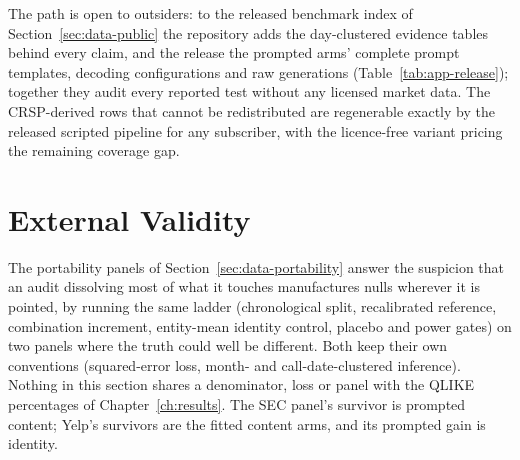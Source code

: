 The path is open to outsiders: to the released benchmark index of Section~\ref{sec:data-public} the repository adds the day-clustered evidence tables behind every claim, and the release the prompted arms' complete prompt templates, decoding configurations and raw generations (Table~\ref{tab:app-release}); together they audit every reported test without any licensed market data. The CRSP-derived rows that cannot be redistributed are regenerable exactly by the released scripted pipeline for any subscriber, with the licence-free variant pricing the remaining coverage gap. %

\section{External Validity}
\label{sec:val-external}

The portability panels of Section~\ref{sec:data-portability} answer the suspicion that an audit dissolving most of what it touches manufactures nulls wherever it is pointed, by running the same ladder (chronological split, recalibrated reference, combination increment, entity-mean identity control, placebo and power gates) on two panels where the truth could well be different. Both keep their own conventions (squared-error loss, month- and call-date-clustered inference). Nothing in this section shares a denominator, loss or panel with the QLIKE percentages of Chapter~\ref{ch:results}. The SEC panel's survivor is prompted content; Yelp's survivors are the fitted content arms, and its prompted gain is identity.

